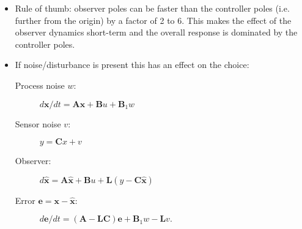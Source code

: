 \begin{itemize}
	\item Rule of thumb: observer poles can be faster than the controller poles (i.e. further from the origin) by a factor of 2 to 6. This makes the effect of the observer dynamics short-term and the overall response is dominated by the controller poles.
	\item If noise/disturbance is present this has an effect on the choice:
	\begin{description}
		\item[Process noise $w$:] $d\mathbf{x}/dt=\mathbf{Ax}+\mathbf{B}u+\mathbf{B}_1 w$
		\item[Sensor noise $v$:]  $y = \mathbf{C}x+v$
		\item[Observer:] $d\hat{\mathbf{x}}=\mathbf{A}\hat{\mathbf{x}}+\mathbf{B}u+\mathbf{L}(y-\mathbf{C}\hat{\mathbf{x}})$
		\item[Error $\mathbf{e}=\mathbf{x}-\hat{\mathbf{x}}$:] $d\mathbf{e}/dt=(\mathbf{A}-\mathbf{LC})\mathbf{e}+\mathbf{B}_1 w - \mathbf{L}v.$
	\end{description}
\end{itemize}

\endinput

